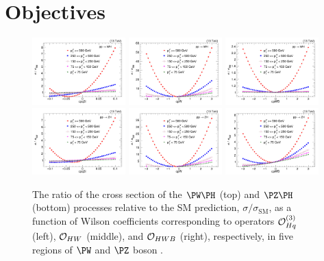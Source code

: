 \documentclass[a4paper,11pt]{article}
\begin{document}
\section{Objectives}
\label{sec:objective}

\begin{figure}[t]
\begin{center}
\includegraphics[width=0.321\textwidth]{Figures/New/LHE/WH/Canv_cpq3i.png}
\includegraphics[width=0.321\textwidth]{Figures/New/LHE/WH/Canv_cpW.png}
\includegraphics[width=0.321\textwidth]{Figures/New/LHE/WH/Canv_cpWB.png}
\includegraphics[width=0.321\textwidth]{Figures/New/LHE/ZH/Canv_cpq3i.png}
\includegraphics[width=0.321\textwidth]{Figures/New/LHE/ZH/Canv_cpW.png}
\includegraphics[width=0.321\textwidth]{Figures/New/LHE/ZH/Canv_cpWB.png}
\end{center}
\caption{
The ratio of the cross section of the $\PW\PH$ (top) and $\PZ\PH$ (bottom) processes relative to the SM prediction, $\sigma/\sigma_{\textrm{SM}}$, as a function of Wilson coefficients corresponding to operators ${\cal O}^{(3)}_{Hq}$ (left), ${\cal O}_{HW}$ (middle), and ${\cal O}_{HWB}$ (right), respectively, in five regions of $\PW$ and $\PZ$ boson {\pt}.
}
\label{fig:LHE_WZH}
\end{figure}
\end{document}
